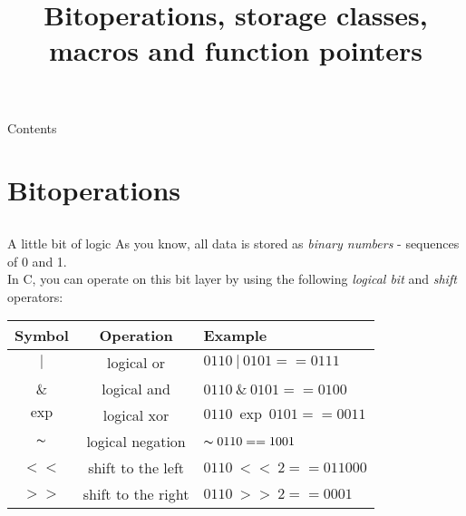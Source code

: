 
\newcommand{\topic}{
	Bitoperations, storage classes, macros and function pointers
}

\title{\topic}
\supertitle{\course}
\date{}



\maketitle

\begin{frame}{Contents}
	\tableofcontents
\end{frame}

\section{Bitoperations}
\subsection{}

\begin{frame}{A little bit of logic}
	As you know, all data is stored as \textit{binary numbers} - sequences of 0 and 1.\\
	In C, you can operate on this bit layer by using the following \textit{logical bit} and \textit{shift} operators:\bigskip
	
	\begin{tabular}{|c|c|l|}
																						  	  \hline
		\textbf{Symbol} 	& \textbf{Operation} 	& \textbf{Example} 							\\\hline
		$|$					& logical or				& $0110\ |\ 0101 == 0111$ 		\\\hline
		$\&$ 				& logical and 				& $0110\ \&\ 0101 == 0100$ 	\\\hline
		$\exp$ 				& logical xor 				& $0110\ \exp\ 0101 == 0011$ 	\\\hline
		$\thicksim$			& logical negation 			& $\thicksim 0110 == 1001$	\\\hline
		$<<$ 			& shift to the left 			& $0110\ <<\ 2 == 011000$ 	\\\hline
		$>>$ 		& shift to the right 				& $0110\ >>\ 2 == 0001$ 			\\\hline
	\end{tabular}
	
\end{frame}

